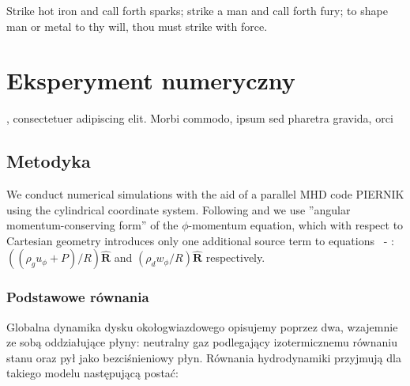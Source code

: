 \begin{savequote}[75mm]
Strike hot iron and call forth sparks; strike a man and call forth fury; to shape man or metal to thy will, thou must
strike with force.
\end{savequote}

\chapter{Eksperyment numeryczny}
, consectetuer adipiscing elit. Morbi commodo, ipsum sed pharetra gravida, orci
\section{Metodyka}
We conduct numerical simulations with the aid of a parallel MHD code PIERNIK
using the cylindrical coordinate system. 
Following \cite{M07} and \cite{SO10} we use ''angular momentum-conserving form''
of the $\phi$-momentum equation, which with respect to Cartesian geometry
introduces only one additional source term to equations~ - :
$\left((\rho_g u_\phi + P) / R\right)\mathbf{\hat{R}}$ and $(\rho_d w_\phi / R)
\mathbf{\hat{R}}$ respectively.


\subsection{Podstawowe równania}
Globalna dynamika dysku okołogwiazdowego opisujemy poprzez dwa, wzajemnie ze
sobą oddziałujące płyny: neutralny gaz podlegający izotermicznemu równaniu
stanu oraz pył jako bezciśnieniowy płyn. Równania hydrodynamiki przyjmują dla
takiego modelu następującą postać:


